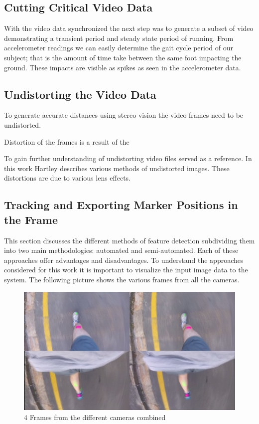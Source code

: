 \subsection{Cutting Critical Video Data}
With the video data synchronized the next step was to generate a subset of video demonstrating a transient period and steady state period of running. From accelerometer readings we can easily determine the gait cycle period of our subject; that is the amount of time take between the same foot impacting the ground. These impacts are visible as spikes as seen in the accelerometer data.  

\subsection{Undistorting the Video Data}
To generate accurate distances using stereo vision the video frames need to be undistorted.

Distortion of the frames is a result of the 

To gain further understanding of undistorting video files \cite{Hartley2004} served as a reference. In this work Hartley describes various methods of undistorted images. These distortions are due to various lens effects.

\subsection{Tracking and Exporting Marker Positions in the Frame}

This section discusses the different methods of feature detection subdividing them into two main methodologies: automated and semi-automated. Each of these approaches offer advantages and disadvantages. To understand the approaches considered for this work it is important to visualize the input image data to the system. The following picture shows the various frames from all the cameras.

\begin{figure}[!ht]
  \includegraphics[width=\linewidth]{figures/pat_run_quad.png}
  \caption{4 Frames from the different cameras combined}
  \label{fig:pat_run_quad}
\end{figure}

